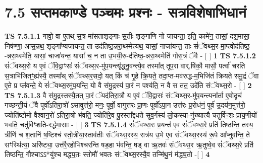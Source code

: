 \documentclass[17pt]{extarticle}
\begin{document}
     \section*{ 7.5      सप्तमकाण्डे पञ्चमः प्रश्नः - सत्रविशेषाभिधानं }
                                        \textbf{ TS 7.5.1.1} \newline
                  गावो॒ वा ए॒तथ् स॒त्र-मा॑सताशृ॒ङ्गाः स॒तीः शृङ्गा॑णि नो जायन्ता॒ इति॒ कामे॑न॒ तासां॒ दश॒मासा॒ निष॑ण्णा॒ आस॒न्नथ॒ शृङ्गा᳚ण्यजायन्त॒ ता उद॑तिष्ठ॒न्नरा॒थ्स्मेत्यथ॒ यासां॒ नाजा॑यन्त॒ ताः सं॑ॅवथ्स॒र-मा॒प्त्वोद॑तिष्ठ॒ -न्नरा॒थ्स्मेति॒ यासां॒ चाजा॑यन्त॒ यासां᳚ च॒ न ता उ॒भयी॒रु-द॑तिष्ठ॒-न्नरा॒थ्स्मेति॑ गोस॒त्रं ॅवै - [  ] \textbf{  1} \newline
                  \newline
                                \textbf{ TS 7.5.1.2} \newline
                  सं॑ॅवथ्स॒रो य ए॒वं ॅवि॒द्वाꣳसः॑ संॅवथ्स॒र-मु॑प॒यन्त्यृ॑द्ध्नु॒वन्त्ये॒व तस्मा᳚त् तूप॒रा वार्.षि॑कौ॒ मासौ॒ पर्त्वा॑ चरति स॒त्राभि॑जितꣳ॒॒ह्य॑स्यै॒ तस्मा᳚थ् संॅवथ्सर॒सदो॒ यत् किं च॑ गृ॒हे क्रि॒यते॒ तदा॒प्त-मव॑रुद्ध-म॒भिजि॑तं क्रियते समु॒द्रं ॅवा ए॒ते प्र प्ल॑वन्ते॒ ये सं॑ॅवथ्स॒रमु॑प॒यन्ति॒ यो वै स॑मु॒द्रस्य॑ पा॒रं न पश्य॑ति॒ न वै स तत॒ उदे॑ति संॅवथ्स॒रो - [  ] \textbf{  2} \newline
                  \newline
                                \textbf{ TS 7.5.1.3} \newline
                  वै स॑मु॒द्रस्तस्यै॒तत् पा॒रं ॅयद॑तिरा॒त्रौ य ए॒वं ॅवि॒द्वासः॑ संॅवथ्स॒र-मु॑प॒यन्त्यना᳚र्ता ए॒वोदृचं॑ गच्छन्ती॒यं ॅवै पूर्वो॑ऽतिरा॒त्रो॑ ऽसावुत्त॑रो॒ मनः॒ पूर्वो॒ वागुत्त॑रः प्रा॒णः पूर्वो॑ऽपा॒न उत्त॑रः प्र॒रोध॑नं॒ पूर्व॑ उ॒दय॑न॒मुत्त॑रो॒ ज्योति॑ष्टोमो वैश्वान॒रो॑ ऽतिरा॒त्रो भ॑वति॒ ज्योति॑रे॒व पु॒रस्ता᳚द्दधते सुव॒र्गस्य॑ लो॒कस्या-नु॑ख्यात्यै चतुर्विꣳ॒॒शः प्रा॑य॒णीयो॑ भवति॒ चतु॑र्विꣳशति-रर्द्धमा॒साः - [  ] \textbf{  3} \newline
                  \newline
                                \textbf{ TS 7.5.1.4} \newline
                  सं॑ॅवथ्स॒रः प्र॒यन्त॑ ए॒व सं॑ॅवथ्स॒रे प्रति॑ तिष्ठन्ति॒ तस्य॒ त्रीणि॑ च श॒तानि॑ ष॒ष्टिश्च॑ स्तो॒त्रीया॒स्ताव॑तीः संॅवथ्स॒रस्य॒ रात्र॑य उ॒भे ए॒व सं॑ॅवथ्स॒रस्य॑ रू॒पे आ᳚प्नुवन्ति॒ ते सꣳस्थि॑त्या॒ अरि॑ष्ट्या॒ उत्त॑रै॒रहो॑भिश्चरन्ति षड॒हा भ॑वन्ति॒ षड् वा ऋ॒तवः॑ संॅवथ्स॒र ऋ॒तुष्वे॒व सं॑ॅवथ्स॒रे प्रति॑ तिष्ठन्ति॒ गौश्चाऽऽ*यु॑श्च मद्ध्य॒तः स्तोमौ॑ भवतः संॅवथ्स॒रस्यै॒व तन्मि॑थु॒नं म॑द्ध्य॒तो -[  ] \textbf{  4} \newline
\end{document}
